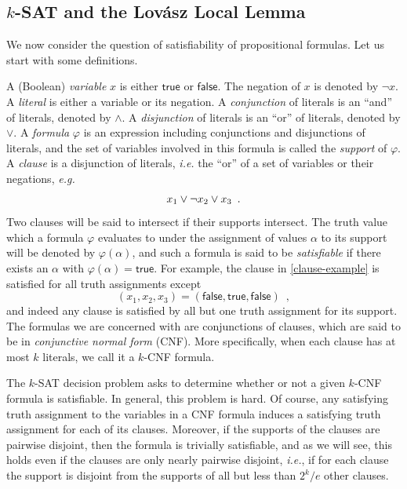 \documentclass[format=acmsmall, review=false, screen=true]{acmart}
\begin{document}
\subsection{$k$-SAT and the Lov\'{a}sz Local Lemma}

We now consider the question of satisfiability of propositional
formulas. Let us start with some definitions.

A (Boolean) \emph{variable} $x$ is either $\textsf{true}$ or
$\textsf{false}$. The negation of $x$ is denoted by $\neg x$. A
\emph{literal} is either a variable or its negation. A
\emph{conjunction} of literals is an ``and'' of literals, denoted by
$\land$. A \emph{disjunction} of literals is an ``or'' of literals,
denoted by $\lor$. A \emph{formula} $\varphi$ is an expression
including conjunctions and disjunctions of literals, and the set of
variables involved in this formula is called the \emph{support} of
$\varphi$. A \emph{clause} is a disjunction of literals, \emph{i.e.}
the ``or'' of a set of variables or their negations, \emph{e.g.}
\begin{align}
  x_1 \lor \neg x_2 \lor x_3 \enspace . \eqlabel{clause-example}
\end{align}
Two clauses will be said to intersect if their supports intersect. The
truth value which a formula $\varphi$ evaluates to under the
assignment of values $\alpha$ to its support will be denoted by
$\varphi(\alpha)$, and such a formula is said to be \emph{satisfiable}
if there exists an $\alpha$ with $\varphi(\alpha) = \textsf{true}$.
For example, the clause in \eqref{clause-example} is satisfied for all
truth assignments except
\[
  (x_1, x_2, x_3) = (\textsf{false}, \textsf{true}, \textsf{false})
  \enspace ,
\]
and indeed any clause is satisfied by all but one truth assignment
for its support. The formulas we are concerned with are conjunctions
of clauses, which are said to be in \emph{conjunctive normal form}
(CNF). More specifically, when each clause has at most $k$
literals, we call it a $k$-CNF formula.

The $k$-SAT decision problem asks to determine whether or not a given
$k$-CNF formula is satisfiable. In general, this problem is hard. Of
course, any satisfying truth assignment to the variables in a CNF
formula induces a satisfying truth assignment for each of its
clauses. Moreover, if the supports of the clauses are pairwise
disjoint, then the formula is trivially satisfiable,
and as we will see, this holds even if the 
clauses are only nearly pairwise disjoint, \emph{i.e.},  if for each
clause the support is disjoint from the supports of all but
less than $2^k/e$ other clauses.
\end{document}
